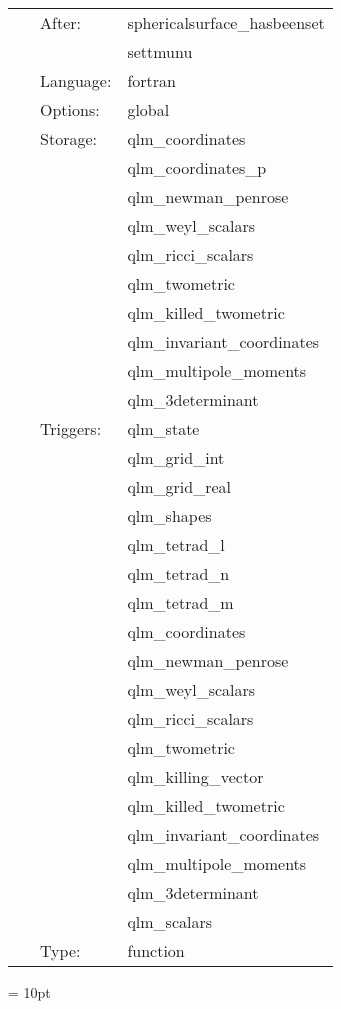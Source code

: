  \begin{tabular*}{160mm}{cll} 
~ & After:  & sphericalsurface\_hasbeenset \\ 
~& ~ &settmunu\\ 
~ & Language:  & fortran \\ 
~ & Options:  & global \\ 
~ & Storage:  & qlm\_coordinates \\ 
~& ~ &qlm\_coordinates\_p\\ 
~& ~ &qlm\_newman\_penrose\\ 
~& ~ &qlm\_weyl\_scalars\\ 
~& ~ &qlm\_ricci\_scalars\\ 
~& ~ &qlm\_twometric\\ 
~& ~ &qlm\_killed\_twometric\\ 
~& ~ &qlm\_invariant\_coordinates\\ 
~& ~ &qlm\_multipole\_moments\\ 
~& ~ &qlm\_3determinant\\ 
~ & Triggers:  & qlm\_state \\ 
~& ~ &qlm\_grid\_int\\ 
~& ~ &qlm\_grid\_real\\ 
~& ~ &qlm\_shapes\\ 
~& ~ &qlm\_tetrad\_l\\ 
~& ~ &qlm\_tetrad\_n\\ 
~& ~ &qlm\_tetrad\_m\\ 
~& ~ &qlm\_coordinates\\ 
~& ~ &qlm\_newman\_penrose\\ 
~& ~ &qlm\_weyl\_scalars\\ 
~& ~ &qlm\_ricci\_scalars\\ 
~& ~ &qlm\_twometric\\ 
~& ~ &qlm\_killing\_vector\\ 
~& ~ &qlm\_killed\_twometric\\ 
~& ~ &qlm\_invariant\_coordinates\\ 
~& ~ &qlm\_multipole\_moments\\ 
~& ~ &qlm\_3determinant\\ 
~& ~ &qlm\_scalars\\ 
~ & Type:  & function \\ 
\end{tabular*} 



\vspace{5mm}\parskip = 10pt 
